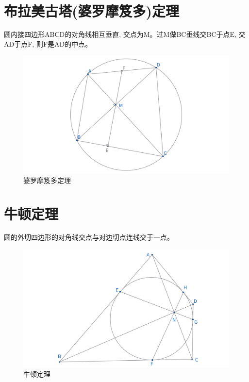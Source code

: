 \newpage
\section{布拉美古塔(婆罗摩笈多)定理}
\begin{theorem}
圆内接四边形ABCD的对角线相互垂直, 交点为M。过M做BC垂线交BC于点E, 交AD于点F, 则F是AD的中点。
\end{theorem}
\begin{figure}[H]
    \centering
    \includegraphics[width=\linewidth]{figures/婆罗摩笈多.png}
    \caption{婆罗摩笈多定理}
\end{figure}



\newpage
\section{牛顿定理}
\begin{theorem}[牛顿(Newton)定理]
圆的外切四边形的对角线交点与对边切点连线交于一点。
\end{theorem}
\begin{figure}[H]
    \centering
    \includegraphics[width=\linewidth]{figures/牛顿定理.png}
    \caption{牛顿定理}
\end{figure}




